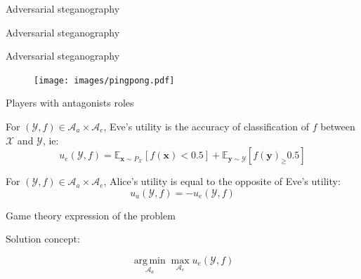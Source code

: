\documentclass[10pt]{beamer}
\DeclareMathOperator*{\argmin}{arg\,min} %
\begin{document}
\begin{frame}{Adversarial steganography}
\end{frame}


\begin{frame}{Adversarial steganography}
\end{frame}



\begin{frame}{Adversarial steganography}
  \begin{figure}
        \texttt{[image: images/pingpong.pdf]}
    \end{figure}
\end{frame}



\begin{frame}{Players with antagonists roles}


\begin{tcolorbox}[colback=lightgreen,colframe=greentheme,title=\textbf{Definition} (Eve's utility)]
For $(\mathcal{Y}, f)  \in \mathcal{A}_a \times \mathcal{A}_e$, Eve's utility is the accuracy of classification of $f$ between $\mathcal{X}$ and $\mathcal{Y}$, ie:
\begin{equation}
    u_e(\mathcal{Y}, f) = \mathbb{E}_{\mathbf{x}\sim P_{\mathcal{X}}}[f(\mathbf{x}) < 0.5] + \mathbb{E}_{\mathbf{y} \sim \mathcal{Y}}[f(\mathbf{y})_ \geq 0.5]
\end{equation}
\end{tcolorbox}


\pause


\begin{tcolorbox}[colback=lightgreen,colframe=greentheme,title=\textbf{Definition} (Alice's utility)]
For $(\mathcal{Y}, f)  \in \mathcal{A}_a \times \mathcal{A}_e$, Alice's utility is equal to the opposite of Eve's utility:
\begin{equation}
    u_a(\mathcal{Y}, f) = - u_e(\mathcal{Y}, f)
\end{equation}
\end{tcolorbox}

\end{frame}

\begin{frame}{Game theory expression of the problem}

Solution concept:

\alert{
    \huge{
        \begin{equation*}
        \underset{\mathcal{A}_a}{\argmin} \max_{\mathcal{A}_e} u_e(\mathcal{Y}, f)
        \end{equation*}
    }
}
    
\end{frame}
\end{document}
